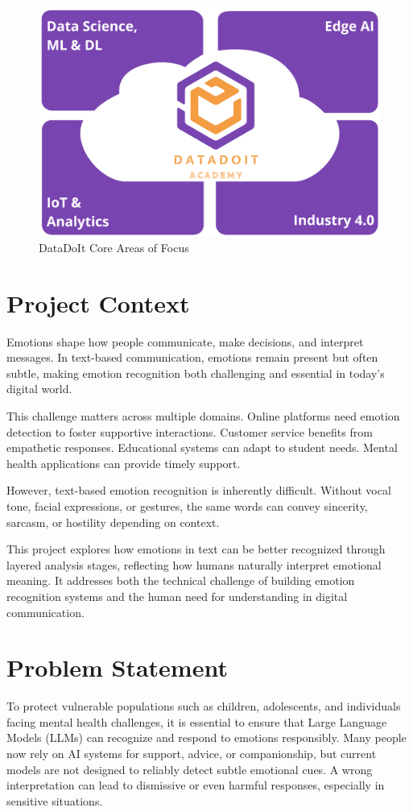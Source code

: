 \begin{figure}[htbp]
    \centering
    \includegraphics[width=0.4\linewidth]{Images/DataDoit.png}
     \vspace{0.5cm}
    \caption{DataDoIt Core Areas of Focus}
    \label{fig:datadoit_focus}
\end{figure}
\section{Project Context} 
 
Emotions shape how people communicate, make decisions, and interpret messages. In text-based communication, emotions remain present but often subtle, making emotion recognition both challenging and essential in today's digital world.
 
\noindent This challenge matters across multiple domains. Online platforms need emotion detection to foster supportive interactions. Customer service benefits from empathetic responses. Educational systems can adapt to student needs. Mental health applications can provide timely support.
\smallskip 
 
\noindent However, text-based emotion recognition is inherently difficult. Without vocal tone, facial expressions, or gestures, the same words can convey sincerity, sarcasm, or hostility depending on context.
\smallskip 
 
\noindent This project explores how emotions in text can be better recognized through layered analysis stages, reflecting how humans naturally interpret emotional meaning. It addresses both the technical challenge of building emotion recognition systems and the human need for understanding in digital communication.
\smallskip

\section{Problem Statement}

To protect vulnerable populations such as children, adolescents, and individuals facing mental health challenges, it is essential to ensure that Large Language Models (LLMs) can recognize and respond to emotions responsibly. Many people now rely on AI systems for support, advice, or companionship, but current models are not designed to reliably detect subtle emotional cues. A wrong interpretation can lead to dismissive or even harmful responses, especially in sensitive situations.  

